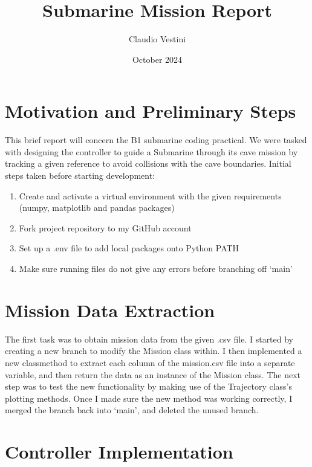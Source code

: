 \documentclass[hidelinks]{article}
\title{Submarine Mission Report}
\author{Claudio Vestini}
\date{October 2024}
\begin{document}
\maketitle
%
\section{Motivation and Preliminary Steps}
This brief report will concern the B1 submarine coding practical.
\newline
We were tasked with designing the controller to guide a Submarine through its cave mission by tracking a given reference to avoid collisions with the cave boundaries.
\newline
Initial steps taken before starting development:
%
\begin{enumerate}
    \item Create and activate a virtual environment with the given requirements (numpy, matplotlib and pandas packages)
    \item Fork project repository to my GitHub account
    \item Set up a .env file to add local packages onto Python PATH
    \item Make sure running files do not give any errors before branching off `main'
\end{enumerate}
%
\section{Mission Data Extraction}
The first task was to obtain mission data from the given .csv file.
\newline
I started by creating a new branch to modify the Mission class within. I then implemented a new classmethod to extract each column of the mission.csv file into a separate variable, and then return the data as an instance of the Mission class.
\newline
The next step was to test the new functionality by making use of the Trajectory class's plotting methods. Once I made sure the new method was working correctly, I merged the branch back into `main', and deleted the unused branch.
%
\section{Controller Implementation}
%
\end{document}
